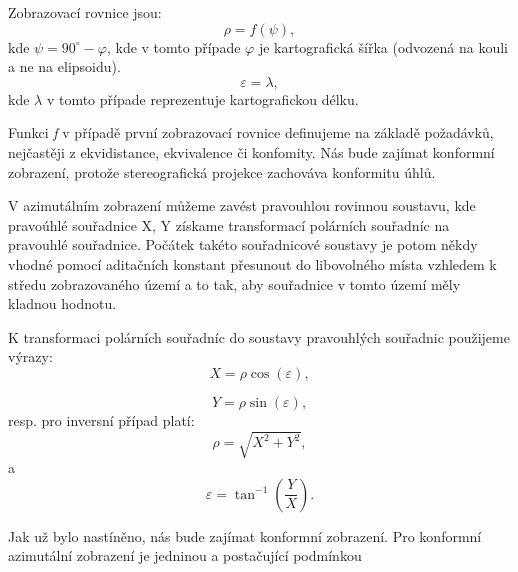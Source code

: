 \documentclass[11pt,a4paper]{article}
\begin{document}
Zobrazovací rovnice jsou:
\begin{equation}
\rho = f\left(\psi\right),
\end{equation}
kde $\psi = 90^{\circ}-\varphi$, kde v tomto případe $\varphi$ je kartografická šířka (odvozená na kouli a ne na elipsoidu).
\begin{equation}
\varepsilon = \lambda,
\end{equation}
kde $\lambda$ v tomto případe reprezentuje kartografickou délku.

Funkci \textit{f} v případě první zobrazovací rovnice definujeme na základě požadávků, nejčastěji z ekvidistance, ekvivalence či konfomity. Nás bude zajímat konformní zobrazení, protože stereografická projekce zachováva konformitu úhlů.

V azimutálním zobrazení můžeme zavést pravouhlou rovinnou soustavu, kde pravoúhlé souřadnice X, Y získame transformací polárních souřadníc na pravouhlé souřadnice. Počátek takéto souřadnicové soustavy je potom někdy vhodné pomocí aditačních konstant přesunout do libovolného místa vzhledem k středu zobrazovaného území a to tak, aby souřadnice v tomto území měly kladnou hodnotu.

K transformaci polárních souřadníc do soustavy pravouhlých souřadnic použijeme výrazy:
\begin{equation}
X = \rho \cos{\left(\varepsilon\right)},
\end{equation}

\begin{equation}
Y = \rho \sin{\left(\varepsilon\right)},
\end{equation}
resp. pro inversní případ platí:
\begin{equation}
\rho = \sqrt{X^{2} + Y^{2}},
\end{equation}
a
\begin{equation}
\varepsilon = \tan^{-1}{\left(\dfrac{Y}{X}\right)}.
\end{equation}

Jak už bylo nastíněno, nás bude zajímat konformní zobrazení. Pro  konformní azimutální zobrazení je jedninou a postačující podmínkou
\end{document}
